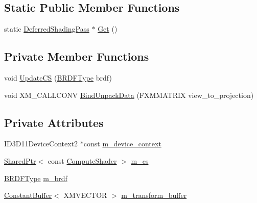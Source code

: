 \subsection*{Static Public Member Functions}
\begin{DoxyCompactItemize}
\item 
static \hyperlink{classmage_1_1_deferred_shading_pass}{Deferred\+Shading\+Pass} $\ast$ \hyperlink{classmage_1_1_deferred_shading_pass_a430dec186afda1f40c695b95fe3f7338}{Get} ()
\end{DoxyCompactItemize}
\subsection*{Private Member Functions}
\begin{DoxyCompactItemize}
\item 
void \hyperlink{classmage_1_1_deferred_shading_pass_aa79caf3b181591b6c25973dc8a1ff134}{Update\+CS} (\hyperlink{namespacemage_ae7a7a03a7b34d7e2689689bb8295cd38}{B\+R\+D\+F\+Type} brdf)
\item 
void X\+M\+\_\+\+C\+A\+L\+L\+C\+O\+NV \hyperlink{classmage_1_1_deferred_shading_pass_aea109ccc921eb53ce00a5803c5dbbea4}{Bind\+Unpack\+Data} (F\+X\+M\+M\+A\+T\+R\+IX view\+\_\+to\+\_\+projection)
\end{DoxyCompactItemize}
\subsection*{Private Attributes}
\begin{DoxyCompactItemize}
\item 
I\+D3\+D11\+Device\+Context2 $\ast$const \hyperlink{classmage_1_1_deferred_shading_pass_aebba2ee59d127f2c186186c667c6016a}{m\+\_\+device\+\_\+context}
\item 
\hyperlink{namespacemage_a1e01ae66713838a7a67d30e44c67703e}{Shared\+Ptr}$<$ const \hyperlink{namespacemage_ae040329401484b076f0cd1a7c43d19c9}{Compute\+Shader} $>$ \hyperlink{classmage_1_1_deferred_shading_pass_a8d3bebdc41d116eb05d9f5a3c923f349}{m\+\_\+cs}
\item 
\hyperlink{namespacemage_ae7a7a03a7b34d7e2689689bb8295cd38}{B\+R\+D\+F\+Type} \hyperlink{classmage_1_1_deferred_shading_pass_a5a466f5c2ee71563f4f8ed6d042ee4b3}{m\+\_\+brdf}
\item 
\hyperlink{structmage_1_1_constant_buffer}{Constant\+Buffer}$<$ X\+M\+V\+E\+C\+T\+OR $>$ \hyperlink{classmage_1_1_deferred_shading_pass_af713e9f0bc35a4be22395483742ee3c3}{m\+\_\+transform\+\_\+buffer}
\end{DoxyCompactItemize}


